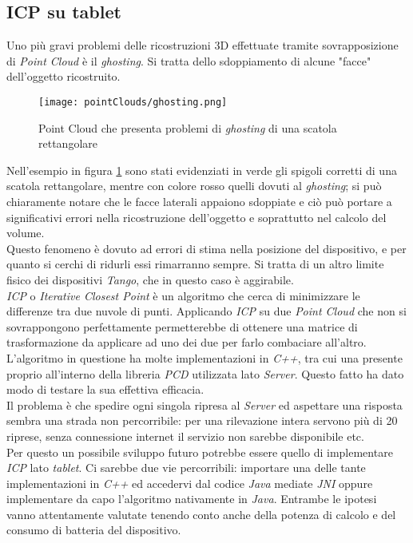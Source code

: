 \subsection{ICP su tablet}\label{subs:ICP}
Uno più gravi problemi delle ricostruzioni 3D effettuate tramite sovrapposizione di \emph{Point Cloud} è il \emph{ghosting}. Si tratta dello sdoppiamento di alcune "facce" dell'oggetto ricostruito.\\
\begin{figure}[!h] 
    \centering 
    \texttt{[image: pointClouds/ghosting.png]} 
    \caption{Point Cloud che presenta problemi di \emph{ghosting} di una scatola rettangolare}
    \label{figure:pcloud_ghosting}
\end{figure}
Nell'esempio in figura \ref{figure:pcloud_ghosting} sono stati evidenziati in verde gli spigoli corretti di una scatola rettangolare, mentre con colore rosso quelli dovuti al \emph{ghosting}; si può chiaramente notare che le facce laterali appaiono sdoppiate e ciò può portare a significativi errori nella ricostruzione dell'oggetto e soprattutto nel calcolo del volume.\\
Questo fenomeno è dovuto ad errori di stima nella posizione del dispositivo, e per quanto si cerchi di ridurli essi rimarranno sempre. Si tratta di un altro limite fisico dei dispositivi \emph{Tango}, che in questo caso è aggirabile.\\
\emph{ICP} o \emph{Iterative Closest Point} è un algoritmo che cerca di minimizzare le differenze tra due nuvole di punti. Applicando \emph{ICP} su due \emph{Point Cloud} che non si sovrappongono perfettamente permetterebbe di ottenere una matrice di trasformazione da applicare ad uno dei due per farlo combaciare all'altro. L'algoritmo in questione ha molte implementazioni in \emph{C++}, tra cui una presente proprio all'interno della libreria \emph{PCD} utilizzata lato \emph{Server}. Questo fatto ha dato modo di testare la sua effettiva efficacia.\\
Il problema è che spedire ogni singola ripresa al \emph{Server} ed aspettare una risposta sembra una strada non percorribile: per una rilevazione intera servono più di 20 riprese, senza connessione internet il servizio non sarebbe disponibile etc.\\
Per questo un possibile sviluppo futuro potrebbe essere quello di implementare \emph{ICP} lato \emph{tablet}. Ci sarebbe due vie percorribili: importare una delle tante implementazioni in \emph{C++} ed accedervi dal codice \emph{Java} mediate \emph{JNI} oppure implementare da capo l'algoritmo nativamente in \emph{Java}. Entrambe le ipotesi vanno attentamente valutate tenendo conto anche della potenza di calcolo e del consumo di batteria del dispositivo.


